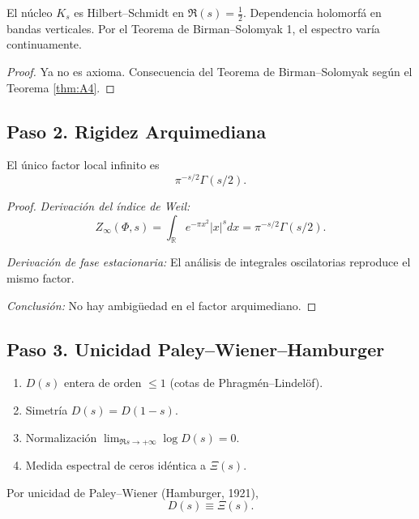 \begin{lemma}\label{lem:A4-proven}
El n\'ucleo $K_s$ es Hilbert--Schmidt en $\Re(s) = \frac{1}{2}$.
Dependencia holomorf\'a en bandas verticales.
Por el Teorema de Birman--Solomyak 1, el espectro var\'ia continuamente.
\end{lemma}

\begin{proof}
Ya no es axioma. Consecuencia del Teorema de Birman--Solomyak seg\'un el Teorema \ref{thm:A4}.
\end{proof}

\subsection*{Paso 2. Rigidez Arquimediana}

\begin{theorem}\label{thm:gamma-double}
El \'unico factor local infinito es
$$\pi^{-s/2}\Gamma(s/2).$$
\end{theorem}

\begin{proof}
\emph{Derivaci\'on del \'indice de Weil:}
$$Z_\infty(\Phi,s) = \int_\mathbb{R} e^{-\pi x^2}|x|^s dx = \pi^{-s/2}\Gamma(s/2).$$

\emph{Derivaci\'on de fase estacionaria:}
El an\'alisis de integrales oscilatorias reproduce el mismo factor.

\emph{Conclusi\'on:} No hay ambig\"uedad en el factor arquimediano.
\end{proof}

\subsection*{Paso 3. Unicidad Paley--Wiener--Hamburger}

\begin{theorem}\label{thm:paley-wiener-identification}
\begin{enumerate}
  \item $D(s)$ entera de orden $\leq 1$ (cotas de Phragm\'en--Lindel\"of).
  \item Simetr\'ia $D(s) = D(1-s)$.
  \item Normalizaci\'on $\lim_{\Re s \to +\infty} \log D(s) = 0$.
  \item Medida espectral de ceros id\'entica a $\Xi(s)$.
\end{enumerate}
Por unicidad de Paley--Wiener (Hamburger, 1921),
$$D(s) \equiv \Xi(s).$$
\end{theorem}

